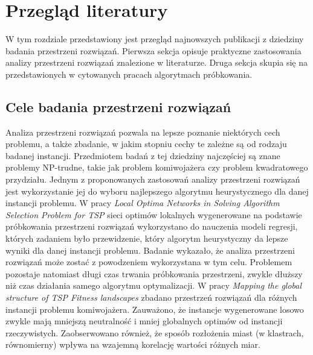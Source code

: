 \chapter{Przegląd literatury}

W tym rozdziale przedstawiony jest przegląd najnowszych publikacji z dziedziny badania przestrzeni rozwiązań.
Pierwsza sekcja opisuje praktyczne zastosowania analizy przestrzeni rozwiązań znalezione w literaturze.
Druga sekcja skupia się na przedstawionych w cytowanych pracach algorytmach próbkowania.

\section{Cele badania przestrzeni rozwiązań}
Analiza przestrzeni rozwiązań pozwala na lepsze poznanie niektórych cech problemu, a także zbadanie, w jakim stopniu cechy te zależne są od
rodzaju badanej instancji. Przedmiotem badań z tej dziedziny najczęściej są znane problemy NP-trudne, takie jak problem komiwojażera czy problem kwadratowego przydziału.
Jednym z proponowanych zastosowań analizy przestrzeni rozwiązań jest wykorzystanie jej do wyboru najlepszego algorytmu heurystycznego
dla danej instancji problemu. W pracy \textit{Local Optima Networks in Solving Algorithm Selection Problem for TSP} \cite{DBLP:conf/depcos/BozejkoGNAB18}
sieci optimów lokalnych wygenerowane na podstawie próbkowania przestrzeni rozwiązań wykorzystano do nauczenia modeli regresji, których zadaniem było
przewidzenie, który algorytm heurystyczny da lepsze wyniki dla danej instancji problemu.
Badanie wykazało, że analiza przestrzeni rozwiązań może zostać z powodzeniem wykorzystana w tym celu.
Problemem pozostaje natomiast długi czas trwania próbkowania przestrzeni, zwykle dłuższy niż czas działania samego algorytmu optymalizacji.
W pracy \textit{Mapping the global structure of TSP Fitness landscapes} \cite{DBLP:journals/heuristics/OchoaV18} zbadano przestrzeń rozwiązań
dla różnych instancji problemu komiwojażera. Zauważono, że instancje wygenerowane losowo zwykle mają mniejszą neutralność i mniej globalnych optimów od
instancji rzeczywistych. Zaobserwowano również, że sposób rozłożenia miast (w klastrach, równomierny) wpływa na wzajemną korelację wartości różnych miar.

